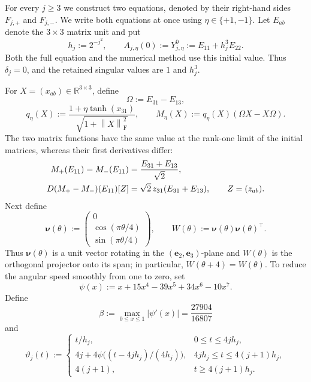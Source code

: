\documentclass[10pt,a4paper]{amsart}
\numberwithin{equation}{section}
\newcommand{\F}{\mathrm F}
\newcommand{\norm}[1]{\left\lVert #1\right\rVert}
\begin{document}
For every $j\ge3$ we construct two equations, denoted by their
right-hand sides $F_{j,+}$ and $F_{j,-}$.  We write both equations at
once using \(\eta\in\{+1,-1\}\).  Let $E_{ab}$ denote the
$3\times3$ matrix unit and put
\begin{equation}\label{eq:hj}
 h_j:=2^{-j^2},
 \qquad A_{j,\eta}(0):=Y_{j,\eta}^0:=E_{11}+h_j^3E_{22}.
\end{equation}
Both the full equation and the numerical method use this initial value.
Thus $\delta_j=0$, and the retained singular values are $1$ and
$h_j^3$.

For $X=(x_{ab})\in\mathbb R^{3\times3}$, define
\begin{equation}\label{eq:M-field}
 \Omega:=E_{31}-E_{13},
\end{equation}
\begin{equation}\label{eq:q-field}
 q_\eta(X):=\frac{1+\eta\tanh(x_{31})}
 {\sqrt{1+\norm{X}_{\F}^2}},
 \qquad M_\eta(X):=q_\eta(X)(\Omega X-X\Omega).
\end{equation}
The two matrix functions have the same value at the rank-one limit of
the initial matrices, whereas their first derivatives differ:
\begin{align}
 M_+(E_{11})=M_-(E_{11})
 &=\frac{E_{31}+E_{13}}{\sqrt2},\notag\\
 D(M_+-M_-)(E_{11})[Z]
 &=\sqrt2\,z_{31}(E_{31}+E_{13}),
 \qquad Z=(z_{ab}).
 \label{eq:pair-design}
\end{align}
Next define
\begin{equation}\label{eq:nu-W}
 \boldsymbol{\nu}(\theta):=
 \begin{pmatrix}0\\ \cos(\pi\theta/4)\\ \sin(\pi\theta/4)\end{pmatrix},
 \qquad W(\theta):=\boldsymbol{\nu}(\theta)
 \boldsymbol{\nu}(\theta)^\top.
\end{equation}
Thus $\boldsymbol\nu(\theta)$ is a unit vector rotating in the
$(\boldsymbol e_2,\boldsymbol e_3)$-plane and $W(\theta)$ is the
orthogonal projector onto its span; in particular, $W(\theta+4)=W(\theta)$.
To reduce the angular speed smoothly from one to zero, set
\begin{equation}\label{eq:psi-def}
 \psi(x):=x+15x^4-39x^5+34x^6-10x^7.
\end{equation}
Define
\begin{equation}\label{eq:beta}
 \beta:=\max_{0\le x\le1}|\psi'(x)|=\frac{27904}{16807}
\end{equation}
and
\begin{equation}\label{eq:phase-def}
 \vartheta_j(t):=
 \begin{cases}
  t/h_j,&0\le t\le4jh_j,\\
  4j+4\psi\bigl((t-4jh_j)/(4h_j)\bigr),
       &4jh_j\le t\le4(j+1)h_j,\\
  4(j+1),&t\ge4(j+1)h_j.
 \end{cases}
\end{equation}
\end{document}
